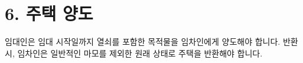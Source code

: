 \section*{6. 주택 양도}
임대인은 임대 시작일까지 열쇠를 포함한 목적물을 임차인에게 양도해야 합니다. 반환 시, 임차인은 일반적인 마모를 제외한 원래 상태로 주택을 반환해야 합니다.
